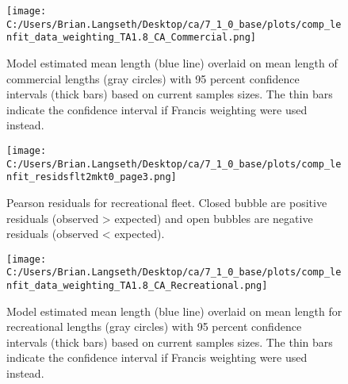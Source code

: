 \documentclass[11pt,
  english,
  a4paper,
]{article}
\begin{document}
\tagmcend\tagstructend


\begin{figure}
\centering
\texttt{[image: C:/Users/Brian.Langseth/Desktop/ca/7\_1\_0\_base/plots/comp\_lenfit\_data\_weighting\_TA1.8\_CA\_Commercial.png]}
\caption{Model estimated mean length (blue line) overlaid on mean length of commercial lengths (gray circles) with 95 percent confidence intervals (thick bars) based on current samples sizes. The thin bars indicate the confidence interval if Francis weighting were used instead.\label{fig:com-mean-len-fit}}
\end{figure}

\tagmcend\tagstructend


\begin{figure}
\centering
\texttt{[image: C:/Users/Brian.Langseth/Desktop/ca/7\_1\_0\_base/plots/comp\_lenfit\_residsflt2mkt0\_page3.png]}
\caption{Pearson residuals for recreational fleet. Closed bubble are positive residuals (observed \textgreater{} expected) and open bubbles are negative residuals (observed \textless{} expected).\label{fig:rec-pearson}}
\end{figure}

\tagmcend\tagstructend


\begin{figure}
\centering
\texttt{[image: C:/Users/Brian.Langseth/Desktop/ca/7\_1\_0\_base/plots/comp\_lenfit\_data\_weighting\_TA1.8\_CA\_Recreational.png]}
\caption{Model estimated mean length (blue line) overlaid on mean length for recreational lengths (gray circles) with 95 percent confidence intervals (thick bars) based on current samples sizes. The thin bars indicate the confidence interval if Francis weighting were used instead.\label{fig:rec-mean-len-fit}}
\end{figure}
\end{document}
